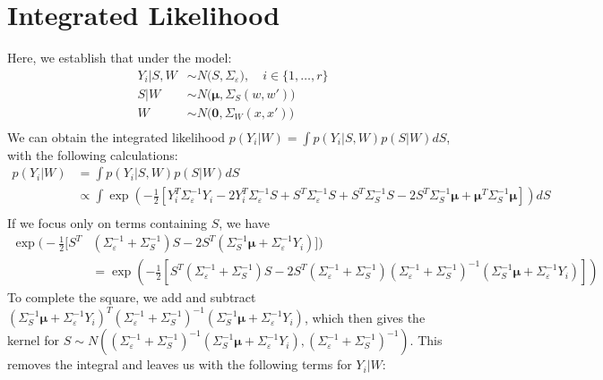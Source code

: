 \documentclass[11pt]{article}
\begin{document}
\section{Integrated Likelihood}
\label{sec:apdx_int_lik}
Here, we establish that under the model:
$$
\begin{aligned}
Y_i|S,W &\sim N\big(S, \Sigma_\varepsilon\big), \quad i \in \{1,\dots, r\}\\
S|W &\sim N\big(\boldsymbol{\mu}, \Sigma_S(w,w')\big)\\
W &\sim N\big(\mathbf{0}, \Sigma_W(x,x')\big) \\
\end{aligned}
$$
We can obtain the integrated likelihood $p(Y_i|W)=\int p(Y_i|S,W)p(S|W) dS$, 
with the following calculations:
$$
\begin{aligned}
p(Y_i|W) &= \int p(Y_i|S,W)p(S|W)dS \\
&\propto \int\exp\left(-\frac{1}{2} \left[Y_i^T\Sigma_\varepsilon^{-1} Y_i 
- 2Y_i^T\Sigma_\varepsilon^{-1} S + S^T \Sigma_\varepsilon^{-1} S + S^T \Sigma_S^{-1} S 
-2S^T \Sigma_S^{-1} \boldsymbol{\mu} 
+ \boldsymbol{\mu}^T \Sigma_S^{-1} \boldsymbol{\mu} \right]\right)dS \\
\end{aligned}
$$
If we focus only on terms containing $S$, we have 
$$
\begin{aligned}
    \exp\Big(-\frac{1}{2} \big[S^T &(\Sigma_\varepsilon^{-1}+\Sigma_S^{-1}) S 
    -2S^T (\Sigma_S^{-1} \boldsymbol{\mu} + \Sigma_\varepsilon^{-1} Y_i) \big]\Big) \\
&= \exp\left(-\frac{1}{2} \left[S^T (\Sigma_\varepsilon^{-1}+\Sigma_S^{-1}) S 
-2S^T (\Sigma_\varepsilon^{-1}+\Sigma_S^{-1})(\Sigma_\varepsilon^{-1}
+\Sigma_S^{-1})^{-1}(\Sigma_S^{-1} \boldsymbol{\mu} + \Sigma_\varepsilon^{-1} Y_i) \right]\right)
\end{aligned}
$$
To complete the square, we add and subtract $(\Sigma_S^{-1} \boldsymbol{\mu} 
+ \Sigma_\varepsilon^{-1} Y_i)^T(\Sigma_\varepsilon^{-1}+\Sigma_S^{-1})^{-1}
(\Sigma_S^{-1} \boldsymbol{\mu} + \Sigma_\varepsilon^{-1} Y_i)$, 
which then gives the kernel for $S \sim N\left((\Sigma_\varepsilon^{-1}
+\Sigma_S^{-1})^{-1}(\Sigma_S^{-1} \boldsymbol{\mu} + \Sigma_\varepsilon^{-1} Y_i), 
(\Sigma_\varepsilon^{-1}+\Sigma_S^{-1})^{-1} \right)$. 
This removes the integral and leaves us with the following terms for $Y_i|W$:
\end{document}
